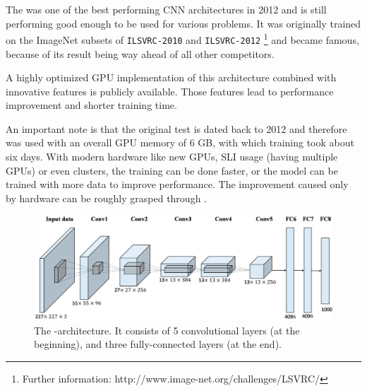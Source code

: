 The \textit{\alexnet} was one of the best performing CNN architectures in 2012 and is still performing good enough to be used for various problems. It was originally trained on the ImageNet subsets of \texttt{ILSVRC-2010} and \texttt{ILSVRC-2012} \footnote{Further information: http://www.image-net.org/challenges/LSVRC/} and became famous, because of its result being way ahead of all other competitors.

A highly optimized GPU implementation of this architecture combined with innovative features is publicly available. Those features lead to performance improvement and shorter training time.\cite{krizhevsky2012imagenet}

An important note is that the original test is dated back to 2012 and therefore was used with an overall GPU memory of 6 GB, with which training took about six days. With modern hardware like new GPUs, SLI usage (having multiple GPUs) or even clusters, the training can be done faster, or the model can be trained with more data to improve performance. The improvement caused only by hardware can be roughly grasped through \cite{sze2017hardware}.


\begin{figure}[ht]
	\centering
	\includegraphics[scale = 1.3]{src/pic/AlexNet-structure-simple.PNG}
	\caption{The \alexnet-architecture. It consists of 5 convolutional layers (at the beginning), and three fully-connected layers (at the end). \cite{han2017pre}
	\cite{krizhevsky2012imagenet}}
	\label{pic: AlexNet}
\end{figure}